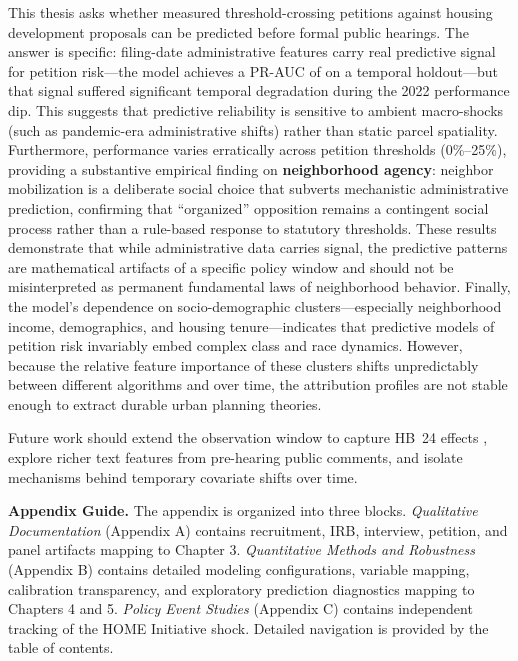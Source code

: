 \documentclass[11pt, letterpaper]{article}
\begin{document}
This thesis asks whether measured threshold-crossing petitions against housing development proposals can be predicted before formal public hearings. The answer is specific: filing-date administrative features carry real predictive signal for petition risk---the model achieves a PR-AUC of \metricBootstrapFiling{} on a temporal holdout---but that signal suffered significant temporal degradation during the 2022 performance dip. This suggests that predictive reliability is sensitive to ambient macro-shocks (such as pandemic-era administrative shifts) rather than static parcel spatiality. Furthermore, performance varies erratically across petition thresholds (0\%--25\%), providing a substantive empirical finding on \textbf{neighborhood agency}: neighbor mobilization is a deliberate social choice that subverts mechanistic administrative prediction, confirming that ``organized'' opposition remains a contingent social process rather than a rule-based response to statutory thresholds. These results demonstrate that while administrative data carries signal, the predictive patterns are mathematical artifacts of a specific policy window and should not be misinterpreted as permanent fundamental laws of neighborhood behavior. Finally, the model's dependence on socio-demographic clusters---especially neighborhood income, demographics, and housing tenure---indicates that predictive models of petition risk invariably embed complex class and race dynamics. However, because the relative feature importance of these clusters shifts unpredictably between different algorithms and over time, the attribution profiles are not stable enough to extract durable urban planning theories.



Future work should extend the observation window to capture HB~24 effects \cite{hb24_2025}, explore richer text features from pre-hearing public comments, and isolate mechanisms behind temporary covariate shifts over time.

\appendix

\newpage
\noindent \textbf{Appendix Guide.} The appendix is organized into three blocks. \textit{Qualitative Documentation} (Appendix A) contains recruitment, IRB, interview, petition, and panel artifacts mapping to Chapter 3. \textit{Quantitative Methods and Robustness} (Appendix B) contains detailed modeling configurations, variable mapping, calibration transparency, and exploratory prediction diagnostics mapping to Chapters 4 and 5. \textit{Policy Event Studies} (Appendix C) contains independent tracking of the HOME Initiative shock. Detailed navigation is provided by the table of contents.
\end{document}
